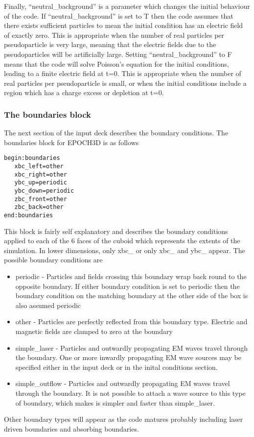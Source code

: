 \documentclass[12pt,a4paper]{article}
\newcommand{\simpleboxverbatim}{\begin{Verbatim}[obeytabs=true,frame=single,
  framerule=0.5mm,rulecolor=\color{warwickmid},formatcom=\color{black}]}
\begin{document}
Finally, ``neutral\_background'' is a parameter which changes the initial
behaviour of the code. If ``neutral\_background'' is set to T then the code
assumes that there exists sufficient particles to mean the initial condition
has an electric field of exactly zero. This is appropriate when the number of
real particles per pseudoparticle is very large, meaning that the electric
fields due to the pseudoparticles will be artificially large. Setting
``neutral\_background'' to F means that the code will solve Poisson's equation
for the initial conditions, leading to a finite electric field at t=0. This is
appropriate when the number of real particles per pseudoparticle is small, or
when the initial conditions include a region which has a charge excess or
depletion at t=0.\\

\subsubsection{The boundaries block}
The next section of the input deck describes the boundary conditions. The
boundaries block for EPOCH3D is as follows\\
\simpleboxverbatim
begin:boundaries
   xbc_left=other
   xbc_right=other
   ybc_up=periodic
   ybc_down=periodic
   zbc_front=other
   zbc_back=other
end:boundaries
\end{Verbatim}

This block is fairly self explanatory and describes the boundary conditions
applied to each of the 6 faces of the cuboid which represents the extents of
the simulation. In lower dimensions, only xbc\_ or only xbc\_ and ybc\_
appear. The possible boundary conditions are\\
\begin{itemize}
\item periodic - Particles and fields crossing this boundary wrap back round
  to the opposite boundary. If either boundary condition is set to periodic
  then the boundary condition on the matching boundary at the other side of
  the box is also assumed periodic
\item other - Particles are perfectly reflected from this boundary
  type. Electric and magnetic fields are clamped to zero at the boundary
\item simple\_laser - Particles and outwardly propagating EM waves travel
  through the boundary. One or more inwardly propagating EM wave sources may
  be specified either in the input deck or in the inital conditions section.
\item simple\_outflow - Particles and outwardly propagating EM waves travel
  through the boundary. It is not possible to attach a wave source to this
  type of boundary, which makes is simpler and faster than simple\_laser.
\end{itemize}
Other boundary types will appear as the code matures probably including laser
driven boundaries and absorbing boundaries.\\
\end{document}
